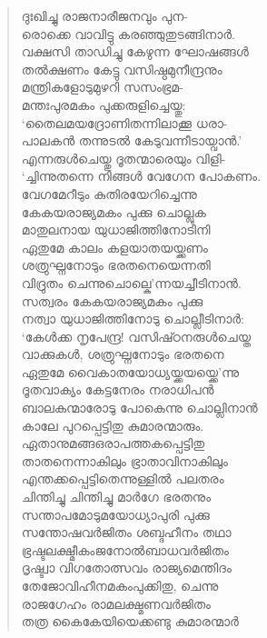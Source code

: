 \begin{verse}
ദുഃഖിച്ചു രാജനാരീജനവും പുന-\\
രൊക്കെ വാവിട്ടു കരഞ്ഞുതുടങ്ങിനാര്‍.\\
വക്ഷസി താഡിച്ചു കേഴുന്ന ഘോഷങ്ങള്‍\\
തല്‍ക്ഷണം കേട്ടു വസിഷ്ഠമുനീന്ദ്രനും\\
മന്ത്രികളോടുമുഴറി സസംഭ്രമ-\\
മന്തഃപുരമകം പുക്കരുളിച്ചെയ്തു:\\
‘തൈലമയദ്രോണിതന്നിലാക്കൂ ധരാ-\\
പാലകന്‍ തന്നുടല്‍ കേടുവന്നീടായ്വാന്‍.’\\
എന്നരുള്‍ചെയ്തു ദൂതന്മാരെയും വിളി-\\
‘ച്ചിന്നുതന്നെ നിങ്ങള്‍ വേഗേന പോകണം.\\
വേഗമേറീടും കുതിരയേറിച്ചെന്നു\\
കേകയരാജ്യമകം പുക്കു ചൊല്ലുക\\
മാതുലനായ യുധാജിത്തിനോടിനി\\
ഏതുമേ കാലം കളയാതയയ്ക്കണം\\
ശത്രുഘ്നനോടും ഭരതനെയെന്നതി\\
വിദ്രുതം ചെന്നുചൊല്കെ’ന്നയച്ചീടിനാന്‍.\\
സത്വരം കേകയരാജ്യമകം പുക്കു\\
നത്വാ യുധാജിത്തിനോടു ചൊല്ലീടിനാര്‍:\\
‘കേള്‍ക്ക നൃപേന്ദ്ര! വസിഷ്‍ഠനരുള്‍ചെയ്ത\\
വാക്കുകള്‍, ശത്രുഘ്നനോടും ഭരതനെ\\
ഏതുമേ വൈകാതയോധ്യയ്ക്കയയ്ക്കെ’ന്നു\\
ദൂതവാക്യം കേട്ടനേരം നരാധിപന്‍\\
ബാലകന്മാരോടു പോകെന്നു ചൊല്ലിനാന്‍\\
കാലേ പുറപ്പെട്ടിതു കുമാരന്മാരും.\\
ഏതാനുമങ്ങഒരാപത്തകപ്പെട്ടിതു\\
താതനെന്നാകിലും ഭ്രാതാവിനാകിലും\\
എന്തക്കപ്പെട്ടിതെന്നുള്ളില്‍ പലതരം\\
ചിന്തിച്ചു ചിന്തിച്ചു മാര്‍ഗേ ഭരതനും\\
സന്താപമോടുമയോധ്യാപുരി പുക്കു\\
സന്തോഷവര്‍ജിതം ശബ്ദഹീനം തഥാ\\
ഭ്രഷ്ടലക്ഷ്മീകംജനോല്‍ബാധവര്‍ജിതം\\
ദൃഷ്ട്വാ വിഗതോത്സവം രാജ്യമെന്തിദം\\
തേജോവിഹീനമകംപുക്കിതു, ചെന്നു\\
രാജഗേഹം രാമലക്ഷ്മണവര്‍ജിതം\\
തത്ര കൈകേയിയെക്കണ്ടു കുമാരന്മാര്‍\\

\end{verse}
